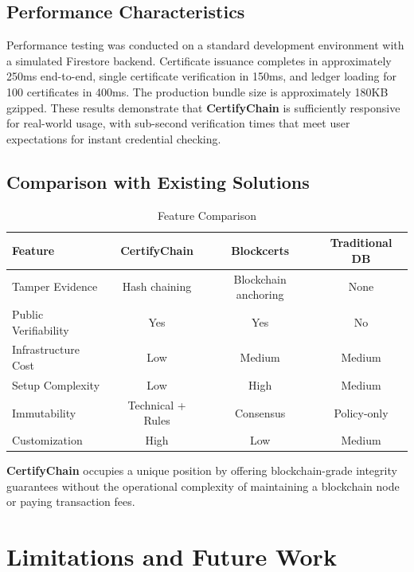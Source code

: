 \documentclass[10pt,twocolumn,a4paper]{article}
\newcommand{\certifychain}{\textbf{CertifyChain}}
\begin{document}
\subsection{Performance Characteristics}

Performance testing was conducted on a standard development environment with a simulated Firestore backend. Certificate issuance completes in approximately 250ms end-to-end, single certificate verification in 150ms, and ledger loading for 100 certificates in 400ms. The production bundle size is approximately 180KB gzipped. These results demonstrate that \certifychain{} is sufficiently responsive for real-world usage, with sub-second verification times that meet user expectations for instant credential checking.

\subsection{Comparison with Existing Solutions}

\begin{table}[H]
    \centering
    \caption{Feature Comparison}
    \label{tab:comparison}
    \begin{tabular}{@{}lccc@{}}
        \toprule
        \textbf{Feature} & \textbf{CertifyChain} & \textbf{Blockcerts} & \textbf{Traditional DB} \\
        \midrule
        Tamper Evidence & Hash chaining & Blockchain anchoring & None \\
        Public Verifiability & Yes & Yes & No \\
        Infrastructure Cost & Low & Medium & Medium \\
        Setup Complexity & Low & High & Medium \\
        Immutability & Technical + Rules & Consensus & Policy-only \\
        Customization & High & Low & Medium \\
        \bottomrule
    \end{tabular}
\end{table}

\certifychain{} occupies a unique position by offering blockchain-grade integrity guarantees without the operational complexity of maintaining a blockchain node or paying transaction fees.

\section{Limitations and Future Work}
\end{document}
